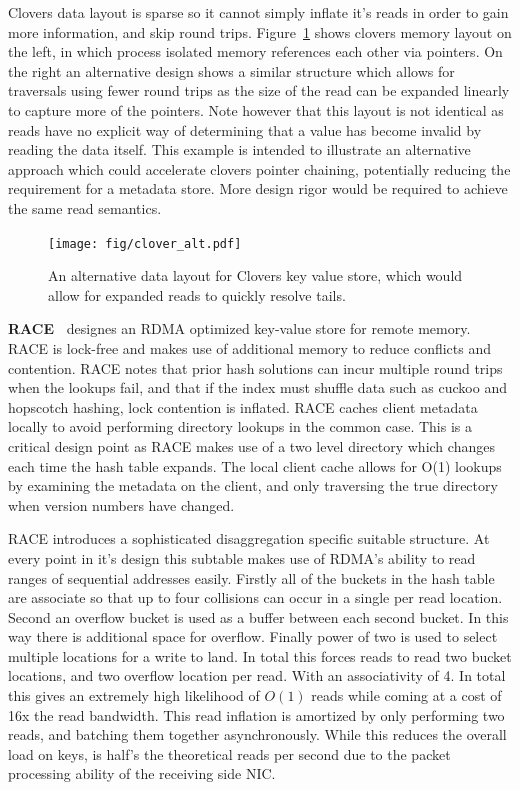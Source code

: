 Clovers data layout is sparse so it cannot simply inflate it's reads in order to
gain more information, and skip round trips. Figure~\ref{fig:clover_alt} shows
clovers memory layout on the left, in which process isolated memory references
each other via pointers. On the right an alternative design shows a similar
structure which allows for traversals using fewer round trips as the size of the
read can be expanded linearly to capture more of the pointers. Note however that
this layout is not identical as reads have no explicit way of determining that a
value has become invalid by reading the data itself. This example is intended to
illustrate an alternative approach which could accelerate clovers pointer
chaining, potentially reducing the requirement for a metadata store. More design
rigor would be required to achieve the same read semantics.


\begin{figure}
    \texttt{[image: fig/clover\_alt.pdf]}

    \caption{An alternative data layout for Clovers key value store, which would
    allow for expanded reads to quickly resolve tails.}

    \label{fig:clover_alt}
\end{figure}


\textbf{RACE~\cite{one-sided-hash}}
designes an RDMA optimized key-value store for remote memory. RACE is
lock-free and makes use of additional memory to reduce conflicts and contention.
RACE notes that prior hash solutions can incur multiple round trips when the
lookups fail, and that if the index must shuffle data such as cuckoo and
hopscotch hashing, lock contention is inflated. RACE caches client metadata
locally to avoid performing directory lookups in the common case. This is a
critical design point as RACE makes use of a two level directory which changes
each time the hash table expands. The local client cache allows for O(1) lookups
by examining the metadata on the client, and only traversing the true directory
when version numbers have changed.

RACE introduces a sophisticated disaggregation specific suitable structure. At
every point in it's design this subtable makes use of RDMA's ability to read
ranges of sequential addresses easily. Firstly all of the buckets in the hash
table are associate so that up to four collisions can occur in a single per read
location. Second an overflow bucket is used as a buffer between each second
bucket. In this way there is additional space for overflow. Finally power of two
is used to select multiple locations for a write to land. In total this forces
reads to read two bucket locations, and two overflow location per read. With an
associativity of 4. In total this gives an extremely high likelihood of $O(1)$
reads while coming at a cost of 16x the read bandwidth. This read inflation is
amortized by only performing two reads, and batching them together
asynchronously. While this reduces the overall load on keys, is half's the
theoretical reads per second due to the packet processing ability of the
receiving side NIC. 

